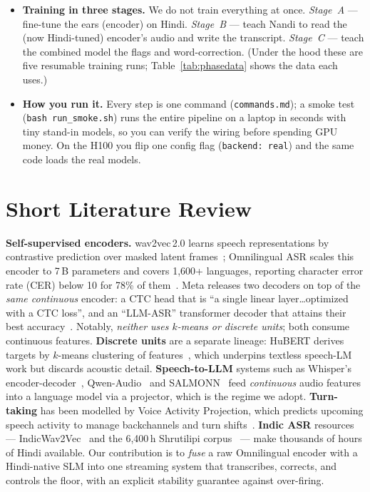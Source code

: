 \documentclass[11pt]{article}
\newcommand{\code}[1]{\texttt{#1}}
\begin{document}
\begin{itemize}[leftmargin=1.4em,itemsep=1pt]
sensibly, producing labelled examples in JSON.
\item \textbf{Training in three stages.} We do not train everything at once.
\emph{Stage~A} --- fine-tune the ears (encoder) on Hindi. \emph{Stage~B} --- teach Nandi to
read the (now Hindi-tuned) encoder's audio and write the transcript. \emph{Stage~C} --- teach
the combined model the flags and word-correction. (Under the hood these are five resumable
training runs; Table~\ref{tab:phasedata} shows the data each uses.)
\item \textbf{How you run it.} Every step is one command (\code{commands.md}); a smoke test
(\code{bash run\_smoke.sh}) runs the entire pipeline on a laptop in seconds with tiny stand-in
models, so you can verify the wiring before spending GPU money. On the H100 you flip one config
flag (\code{backend: real}) and the same code loads the real models.
\end{itemize}

\section{Short Literature Review}
\textbf{Self-supervised encoders.} wav2vec\,2.0 learns speech representations by contrastive
prediction over masked latent frames~\cite{w2v2}; Omnilingual ASR scales this encoder to
7\,B parameters and covers 1{,}600+ languages, reporting character error rate (CER) below
10 for 78\% of them~\cite{omni}. Meta releases two decoders on top of the \emph{same
continuous} encoder: a CTC head that is ``a single linear layer\ldots optimized with a CTC
loss'', and an ``LLM-ASR'' transformer decoder that attains their best accuracy~\cite{omni}.
Notably, \emph{neither uses $k$-means or discrete units}; both consume continuous features.
\textbf{Discrete units} are a separate lineage: HuBERT derives targets by $k$-means
clustering of features~\cite{hubert}, which underpins textless speech-LM work but discards
acoustic detail. \textbf{Speech-to-LLM} systems such as Whisper's encoder-decoder~\cite{whisper},
Qwen-Audio~\cite{qwenaudio,qwen2audio} and SALMONN~\cite{salmonn} feed \emph{continuous}
audio features into a language model via a projector, which is the regime we adopt.
\textbf{Turn-taking} has been modelled by Voice Activity Projection, which predicts upcoming
speech activity to manage backchannels and turn shifts~\cite{vap}. \textbf{Indic ASR}
resources --- IndicWav2Vec~\cite{indicw2v} and the 6{,}400\,h Shrutilipi corpus~\cite{shrutilipi}
--- make thousands of hours of Hindi available. Our contribution is to \emph{fuse} a raw
Omnilingual encoder with a Hindi-native SLM into one streaming system that transcribes,
corrects, and controls the floor, with an explicit stability guarantee against over-firing.
\end{document}
